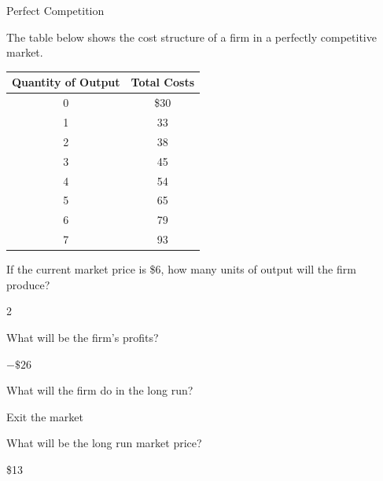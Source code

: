 \documentclass[pdf, handout]{beamer}
\begin{document}
\begin{frame}{Perfect Competition}
	
The table below shows the cost structure of a firm in a perfectly competitive market. 

\begin{table}[ht]
	\centering
	\begin{tabular}{ c | c }        
		
		Quantity of Output & Total Costs \\
		\hline
		0 & \$30\\
		1 & 33 \\
		2 & 38 \\
		3 & 45 \\
		4 & 54 \\
		5 & 65 \\
		6 & 79  \\
		7 & 93 \\
		
		
	\end{tabular}
\end{table}

If the current market price is \$6, how many units of output will the firm produce? 

\pause
\begin{flushright}
	
	\color{red} 2
	
\end{flushright}
	
\end{frame}

\begin{frame}
	
What will be the firm's profits?

\pause
\begin{flushright}
	
	\color{red} $-\$26$
	
\end{flushright}

\pause

What will the firm do in the long run?
	
\pause
\begin{flushright}
	
	\color{red} Exit the market
	
\end{flushright}	

\pause

What will be the long run market price?

\pause
\begin{flushright}
	
	\color{red} \$13
	
\end{flushright}	

	
\end{frame}
\end{document}
